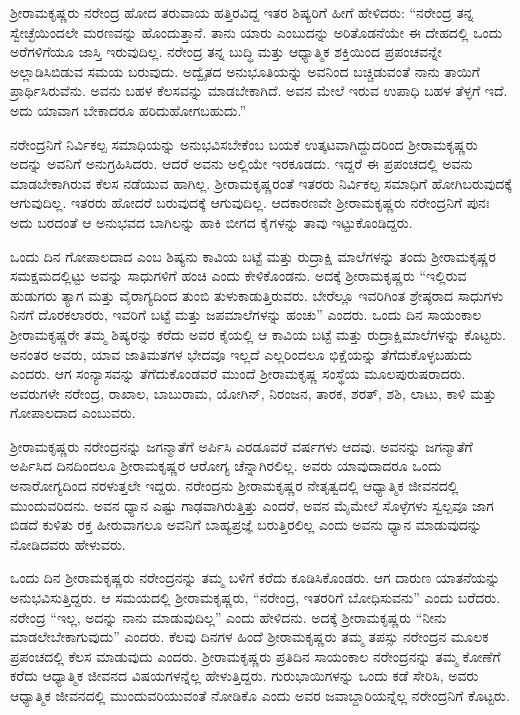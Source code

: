 ಶ‍್ರೀರಾಮಕೃಷ್ಣರು ನರೇಂದ್ರ ಹೋದ ತರುವಾಯ ಹತ್ತಿರವಿದ್ದ ಇತರ ಶಿಷ್ಯರಿಗೆ ಹೀಗೆ ಹೇಳಿದರು: “ನರೇಂದ್ರ ತನ್ನ ಸ್ವೇಚ್ಛೆಯಿಂದಲೇ ಮರಣವನ್ನು ಹೊಂದುತ್ತಾನೆ. ತಾನು ಯಾರು ಎಂಬುದನ್ನು ಅರಿತೊಡನೆಯೇ ಈ ದೇಹದಲ್ಲಿ ಒಂದು ಅರೆಗಳಿಗೆಯೂ ಜಾಸ್ತಿ ಇರುವುದಿಲ್ಲ. ನರೇಂದ್ರ ತನ್ನ ಬುದ್ಧಿ ಮತ್ತು ಆಧ್ಯಾತ್ಮಿಕ ಶಕ್ತಿಯಿಂದ ಪ್ರಪಂಚವನ್ನೇ ಅಲ್ಲಾಡಿಸಿಬಿಡುವ ಸಮಯ ಬರುವುದು. ಅದ್ವೈತದ ಅನುಭೂತಿಯನ್ನು ಅವನಿಂದ ಬಚ್ಚಿಡುವಂತೆ ನಾನು ತಾಯಿಗೆ ಪ್ರಾರ್ಥಿಸಿರುವೆನು. ಅವನು ಬಹಳ ಕೆಲಸವನ್ನು ಮಾಡಬೇಕಾಗಿದೆ. ಅವನ ಮೇಲೆ ಇರುವ ಉಪಾಧಿ ಬಹಳ ತೆಳ್ಳಗೆ ಇದೆ. ಅದು ಯಾವಾಗ ಬೇಕಾದರೂ ಹರಿದುಹೋಗಬಹುದು.”

ನರೇಂದ್ರನಿಗೆ ನಿರ್ವಿಕಲ್ಪ ಸಮಾಧಿಯನ್ನು ಅನುಭವಿಸಬೇಕೆಂಬ ಬಯಕೆ ಉತ್ಕಟವಾಗಿದ್ದುದರಿಂದ ಶ‍್ರೀರಾಮಕೃಷ್ಣರು ಅದನ್ನು ಅವನಿಗೆ ಅನುಗ್ರಹಿಸಿದರು. ಆದರೆ ಅವನು ಅಲ್ಲಿಯೇ ಇರಕೂಡದು. ಇದ್ದರೆ ಈ ಪ್ರಪಂಚದಲ್ಲಿ ಅವನು ಮಾಡಬೇಕಾಗಿರುವ ಕೆಲಸ ನಡೆಯುವ ಹಾಗಿಲ್ಲ. ಶ‍್ರೀರಾಮಕೃಷ್ಣರಂತೆ ಇತರರು ನಿರ್ವಿಕಲ್ಪ ಸಮಾಧಿಗೆ ಹೋಗಿಬರುವುದಕ್ಕೆ ಆಗುವುದಿಲ್ಲ. ಇತರರು ಹೋದರೆ ಬರುವುದಕ್ಕೆ ಆಗುವುದಿಲ್ಲ. ಆದಕಾರಣವೇ ಶ‍್ರೀರಾಮಕೃಷ್ಣರು ನರೇಂದ್ರನಿಗೆ ಪುನಃ ಅದು ಬರದಂತೆ ಆ ಅನುಭವದ ಬಾಗಿಲನ್ನು ಹಾಕಿ ಬೀಗದ ಕೈಗಳನ್ನು ತಾವು ಇಟ್ಟುಕೊಂಡಿದ್ದರು.

ಒಂದು ದಿನ ಗೋಪಾಲದಾದ ಎಂಬ ಶಿಷ್ಯನು ಕಾವಿಯ ಬಟ್ಟೆ ಮತ್ತು ರುದ್ರಾಕ್ಷಿ ಮಾಲೆಗಳನ್ನು ತಂದು ಶ‍್ರೀರಾಮಕೃಷ್ಣರ ಸಮಕ್ಷಮದಲ್ಲಿಟ್ಟು ಅವನ್ನು ಸಾಧುಗಳಿಗೆ ಹಂಚಿ ಎಂದು ಕೇಳಿಕೊಂಡನು. ಅದಕ್ಕೆ ಶ‍್ರೀರಾಮಕೃಷ್ಣರು “ಇಲ್ಲಿರುವ ಹುಡುಗರು ತ್ಯಾಗ ಮತ್ತು ವೈರಾಗ್ಯದಿಂದ ತುಂಬಿ ತುಳುಕಾಡುತ್ತಿರುವರು. ಬೇರೆಲ್ಲೂ ಇವರಿಗಿಂತ ಶ್ರೇಷ್ಠರಾದ ಸಾಧುಗಳು ನಿನಗೆ ದೊರಕಲಾರರು, ಇವರಿಗೆ ಬಟ್ಟೆ ಮತ್ತು ಜಪಮಾಲೆಗಳನ್ನು ಹಂಚು” ಎಂದರು. ಒಂದು ದಿನ ಸಾಯಂಕಾಲ ಶ‍್ರೀರಾಮಕೃಷ್ಣರೇ ತಮ್ಮ ಶಿಷ್ಯರನ್ನು ಕರೆದು ಅವರ ಕೈಯಲ್ಲಿ ಆ ಕಾವಿಯ ಬಟ್ಟೆ ಮತ್ತು ರುದ್ರಾಕ್ಷಿಮಾಲೆಗಳನ್ನು ಕೊಟ್ಟರು. ಅನಂತರ ಅವರು, ಯಾವ ಜಾತಿಮತಗಳ ಭೇದವೂ ಇಲ್ಲದೆ ಎಲ್ಲರಿಂದಲೂ ಭಿಕ್ಷೆಯನ್ನು ತೆಗೆದುಕೊಳ್ಳಬಹುದು ಎಂದರು. ಆಗ ಸಂನ್ಯಾಸವನ್ನು ತೆಗೆದುಕೊಂಡವರೆ ಮುಂದೆ ಶ‍್ರೀರಾಮಕೃಷ್ಣ ಸಂಸ್ಥೆಯ ಮೂಲಪುರುಷರಾದರು. ಅವರುಗಳೇ ನರೇಂದ್ರ, ರಾಖಾಲ, ಬಾಬುರಾಮ, ಯೋಗಿನ್, ನಿರಂಜನ, ತಾರಕ, ಶರತ್, ಶಶಿ, ಲಾಟು, ಕಾಳಿ ಮತ್ತು ಗೋಪಾಲದಾದ ಎಂಬುವರು.

ಶ‍್ರೀರಾಮಕೃಷ್ಣರು ನರೇಂದ್ರನನ್ನು ಜಗನ್ಮಾತೆಗೆ ಅರ್ಪಿಸಿ ಎರಡೂವರೆ ವರ್ಷಗಳು ಆದವು. ಅವನನ್ನು ಜಗನ್ಮಾತೆಗೆ ಅರ್ಪಿಸಿದ ದಿನದಿಂದಲೂ ಶ‍್ರೀರಾಮಕೃಷ್ಣರ ಆರೋಗ್ಯ ಚೆನ್ನಾಗಿರಲಿಲ್ಲ. ಅವರು ಯಾವುದಾದರೂ ಒಂದು ಅನಾರೋಗ್ಯದಿಂದ ನರಳುತ್ತಲೇ ಇದ್ದರು. ನರೇಂದ್ರನು ಶ‍್ರೀರಾಮಕೃಷ್ಣರ ನೇತೃತ್ವದಲ್ಲಿ ಆಧ್ಯಾತ್ಮಿಕ ಜೀವನದಲ್ಲಿ ಮುಂದುವರಿದನು. ಅವನ ಧ್ಯಾನ ಎಷ್ಟು ಗಾಢವಾಗಿರುತ್ತಿತ್ತು ಎಂದರೆ, ಅವನ ಮೈಮೇಲೆ ಸೊಳ್ಳೆಗಳು ಸ್ವಲ್ಪವೂ ಜಾಗ ಬಿಡದೆ ಕುಳಿತು ರಕ್ತ ಹೀರುವಾಗಲೂ ಅವನಿಗೆ ಬಾಹ್ಯಪ್ರಜ್ಞೆ ಬರುತ್ತಿರಲಿಲ್ಲ ಎಂದು ಅವನು ಧ್ಯಾನ ಮಾಡುವುದನ್ನು ನೋಡಿದವರು ಹೇಳುವರು.

ಒಂದು ದಿನ ಶ‍್ರೀರಾಮಕೃಷ್ಣರು ನರೇಂದ್ರನನ್ನು ತಮ್ಮ ಬಳಿಗೆ ಕರೆದು ಕೂಡಿಸಿಕೊಂಡರು. ಆಗ ದಾರುಣ ಯಾತನೆಯನ್ನು ಅನುಭವಿಸುತ್ತಿದ್ದರು. ಆ ಸಮಯದಲ್ಲಿ ಶ‍್ರೀರಾಮಕೃಷ್ಣರು, “ನರೇಂದ್ರ, ಇತರರಿಗೆ ಬೋಧಿಸುವನು” ಎಂದು ಬರೆದರು. ನರೇಂದ್ರ “ಇಲ್ಲ, ಅದನ್ನು ನಾನು ಮಾಡುವುದಿಲ್ಲ” ಎಂದು ಹೇಳಿದನು. ಅದಕ್ಕೆ ಶ‍್ರೀರಾಮಕೃಷ್ಣರು “ನೀನು ಮಾಡಲೇಬೇಕಾಗುವುದು” ಎಂದರು. ಕೆಲವು ದಿನಗಳ ಹಿಂದೆ ಶ‍್ರೀರಾಮಕೃಷ್ಣರು ತಮ್ಮ ತಪಸ್ಸು ನರೇಂದ್ರನ ಮೂಲಕ ಪ್ರಪಂಚದಲ್ಲಿ ಕೆಲಸ ಮಾಡುವುದು ಎಂದರು. ಶ‍್ರೀರಾಮಕೃಷ್ಣರು ಪ್ರತಿದಿನ ಸಾಯಂಕಾಲ ನರೇಂದ್ರನನ್ನು ತಮ್ಮ ಕೋಣೆಗೆ ಕರೆದು ಆಧ್ಯಾತ್ಮಿಕ ಜೀವನದ ವಿಷಯಗಳನ್ನೆಲ್ಲ ಹೇಳುತ್ತಿದ್ದರು. ಗುರುಭಾಯಿಗಳನ್ನು ಒಂದು ಕಡೆ ಸೇರಿಸಿ, ಅವರು ಆಧ್ಯಾತ್ಮಿಕ ಜೀವನದಲ್ಲಿ ಮುಂದುವರಿಯುವಂತೆ ನೋಡಿಕೊ ಎಂದು ಅವರ ಜವಾಬ್ದಾರಿಯನ್ನೆಲ್ಲ ನರೇಂದ್ರನಿಗೆ ಕೊಟ್ಟರು.

